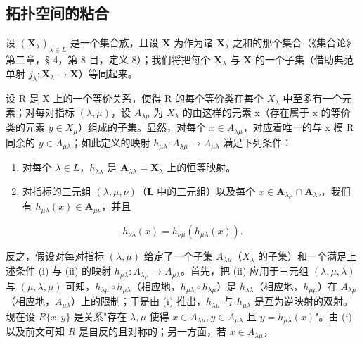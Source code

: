 \subsection{拓扑空间的粘合}

设 \((\mathbf{X}_{\lambda})_{\lambda \in L}\) 是一个集合族，且设 \(\mathbf{X}\) 为作为诸 \(\mathbf{X}_{\lambda}\) 之和的那个集合（《集合论》第二章，§ 4，第 8 目，定义 8）；我们将把每个 \(\mathbf{X}_{\lambda}\) 与 \(\mathbf{X}\) 的一个子集（借助典范单射 \(j_{\lambda}: \mathbf{X}_{\lambda} \to \mathbf{X}\)）等同起来。

设 R 是 X 上的一个等价关系，使得 R 的每个等价类在每个 \(X_{\lambda}\) 中至多有一个元素；对每对指标 \((\lambda, \mu)\)，设 \(A_{\lambda\mu}\) 为 \(X_{\lambda}\) 的由这样的元素 x（存在属于 x 的等价类的元素 \(y \in X_{\mu}\)）组成的子集。显然，对每个 \(x \in A_{\lambda\mu}\)，对应着唯一的与 x 模 R 同余的 \(y \in A_{\mu\lambda}\)；如此定义的映射 \(h_{\mu\lambda}: A_{\lambda\mu} \to A_{\mu\lambda}\) 满足下列条件：

\begin{enumerate}
\def\labelenumi{(\roman{enumi})}
\item
  对每个 \(\lambda \in L\)，\(h_{\lambda \lambda}\) 是 \(\mathbf{A}_{\lambda \lambda} = \mathbf{X}_{\lambda}\) 上的恒等映射。
\item
  对指标的三元组 \((\lambda, \mu, \nu)\)（\(\mathbf{L}\) 中的三元组）以及每个 \(x \in \mathbf{A}_{\lambda \mu} \cap \mathbf{A}_{\lambda \nu}\)，我们有 \(h_{\mu \lambda}(x) \in \mathbf{A}_{\mu \nu}\)，并且
\end{enumerate}

\[
h _ {\nu \lambda} (x) = h _ {\nu \mu} (h _ {\mu \lambda} (x)).\tag{1}
\]

反之，假设对每对指标 \((\lambda, \mu)\) 给定了一个子集 \(A_{\lambda \mu}\)（\(X_{\lambda}\) 的子集）和一个满足上述条件 (i) 与 (ii) 的映射 \(h_{\mu \lambda}: A_{\lambda \mu} \to A_{\mu \lambda}\)。首先，把 (ii) 应用于三元组 \((\lambda, \mu, \lambda)\) 与 \((\mu, \lambda, \mu)\) 可知，\(h_{\lambda \mu} \circ h_{\mu \lambda}\)（相应地，\(h_{\mu \lambda} \circ h_{\lambda \mu}\)）是 \(h_{\lambda \lambda}\)（相应地，\(h_{\mu \mu}\)）在 \(A_{\lambda \mu}\)（相应地，\(A_{\mu \lambda}\)）上的限制；于是由 (i) 推出，\(h_{\lambda \mu}\) 与 \(h_{\mu \lambda}\) 是互为逆映射的双射。现在设 \(R\{x, y\}\) 是关系"存在 \(\lambda, \mu\) 使得 \(x \in A_{\lambda \mu}, y \in A_{\mu \lambda}\) 且 \(y = h_{\mu \lambda}(x)\)"。由 (i) 以及前文可知 \(R\) 是自反的且对称的；另一方面，若 \(x \in A_{\lambda \mu}\)，

